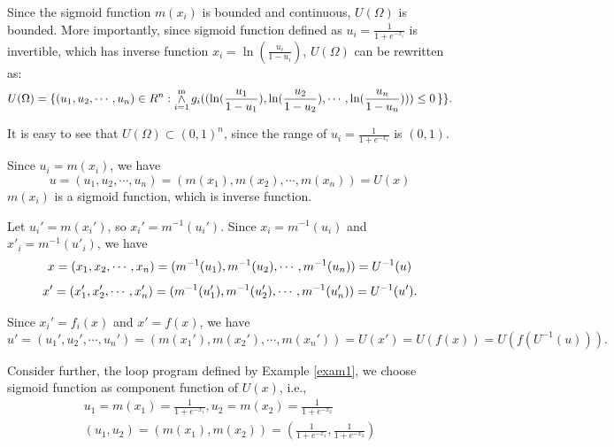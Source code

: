 Since the sigmoid function $m({x_i})$ is bounded and continuous, $U(\Omega )$ is bounded. More importantly, since sigmoid function defined as ${u_i} = \frac{1}{{1 + {e^{ - {x_i}}}}}$ is invertible, which has inverse function ${x_i} = \ln (\frac{{{u_i}}}{{1 - {u_i}}})$, $U(\Omega )$ can be rewritten as:
\begin{equation}\label{equ:Uu}
U(\Omega ) = \{ ({u_1},{u_2}, \cdots ,{u_n}) \in {R^n}:\mathop  \wedge \limits_{i = 1}^{\rm{m}} {g_i}((\ln (\frac{{{u_1}}}{{1 - {u_1}}}),\ln (\frac{{{u_2}}}{{1 - {u_2}}}), \cdots ,\ln (\frac{{{u_n}}}{{1 - {u_n}}}))) \le 0\,\} \}. 
\end{equation}

It is easy to see that $U(\Omega) \subset (0,1)^n$, since the range of ${u_i} = \frac{1}{{1 + {e^{ - {x_i}}}}}$ is $(0,1)$.

Since ${u_i} = m({x_i})$, we have 
\begin{equation}\label{equ:u}
u = ({u_1},{u_2}, \cdots ,{u_n}) = (m({x_1}),m({x_2}), \cdots ,m({x_n})) = U(x)
\end{equation}
$m({x_i})$ is a sigmoid function, which is inverse function. 

Let ${{u_i}'} = m({{x_i}'})$, so ${{x_i}'} = {m^{ - 1}}({{u_i}'})$. 
Since ${x_i} = {m^{ - 1}}({u_i})$ and ${x'_i} = {m^{ - 1}}({u'_i})$, we have
\begin{equation}\label{equ:x}
x = ({x_1},{x_2}, \cdots ,{x_n}) = ({m^{ - 1}}({u_1}),{m^{ - 1}}({u_2}), \cdots ,{m^{ - 1}}({u_n})) = {U^{{\rm{ - 1}}}}(u)
\end{equation}
\begin{equation}\label{equ:x'}
x' = ({x'_1},{x'_2}, \cdots ,{x'_n}) = ({m^{ - 1}}({u'_1}),{m^{ - 1}}({u'_2}), \cdots ,{m^{ - 1}}({u'_n})) = {U^{{\rm{ - 1}}}}(u').
\end{equation}

Since ${{x_i}'} = {f_i}(x)$ and $x' = f(x)$, we have 
\begin{equation}\label{equ:u'}
u' = ({{u_1}'},{{u_2}'}, \cdots ,{{u_n}'}) = (m({{x_1}'}),m({{x_2}'}), \cdots ,m({{x_n}'}))=U(x') = U(f(x)) = U(f({U^{ - 1}}(u))).
\end{equation}

\begin{exam}\label{exam2}
	Consider further, the loop program defined by Example \ref{exam1}, we choose sigmoid function as component function of $U(x)$, i.e.,
	$$\begin{array}{l}
	{u_1} = m({x_1}) = \frac{1}{{1 + {e^{ - {x_1}}}}},{u_2} = m({x_2}) = \frac{1}{{1 + {e^{ - {x_2}}}}}\\
	({u_1},{u_2}) = (m({x_1}),m({x_2})) = (\frac{1}{{1 + {e^{ - {x_1}}}}},\frac{1}{{1 + {e^{ - {x_2}}}}})
	\end{array}$$
\end{exam}


